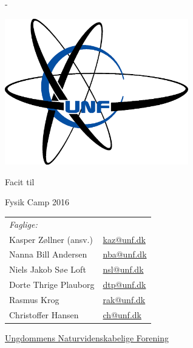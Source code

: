 \begin{titlingpage}
  \newlength{\frontpagecorrection}
  \calccentering{\frontpagecorrection}

  \begin{adjustwidth*}{\frontpagecorrection-2cm}{-\frontpagecorrection-2cm}
    
  \centering

  \vfill

  \includegraphics[width=8cm]{old/Unflogo.eps}
 
  \scshape
    
  \fontsize{24pt}{28pt}\selectfont

  \bigskip

  \vspace{0.5cm}

  Facit til\par
    
  Fysik Camp 2016\par

  \vspace{1cm}
  
  \begin{table}[h!]
    \centering
    \begin{tabular}{ll}
      \textit{Faglige:} & \\
      Kasper Zøllner (ansv.)       & \href{mailto:kaz@unf.dk}{kaz@unf.dk} \\
      Nanna Bill Andersen          & \href{mailto:nba@unf.dk}{nba@unf.dk} \\
      Niels Jakob Søe Loft         & \href{mailto:nsl@unf.dk}{nsl@unf.dk} \\
      Dorte Thrige Plauborg        & \href{mailto:dtp@unf.dk}{dtp@unf.dk} \\
      Rasmus Krog                  & \href{mailto:rak@unf.dk}{rak@unf.dk} \\
      Christoffer Hansen           & \href{mailto:ch@unf.dk}{ch@unf.dk} \\
    \end{tabular}
  \end{table}

  \vfill
    
  \fontsize{14pt}{18pt}\selectfont
  \href{http://www.unf.dk/}{Ungdommens Naturvidenskabelige
    Forening}\par
  \end{adjustwidth*}
\end{titlingpage}


